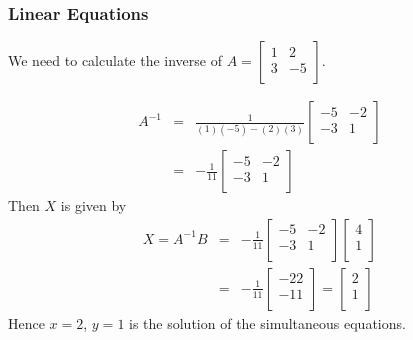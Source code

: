   \begin{frame}[fragile]\frametitle{Linear Equations}

We need to calculate the inverse of $A=\left[
\begin{array}{cc}
1 & 2 \\
3 & -5 \\
\end{array}
\right]$.

\begin{eqnarray*}
A^{-1} &=& \frac{1}{(1)(-5)-(2)(3)}\left[
\begin{array}{cc}
-5 & -2 \\
-3 & 1 \\
\end{array}
\right] \\
&=& -\frac{1}{11}\left[
\begin{array}{cc}
-5 & -2 \\
-3 & 1 \\
\end{array}
\right] 
\end{eqnarray*}
Then $X$ is given by
\begin{eqnarray*}
X = A^{-1}B &=&-\frac{1}{11}\left[
\begin{array}{cc}
-5 & -2 \\
-3 & 1 \\
\end{array}
\right]  \left[
\begin{array}{c}
4 \\
1\\
\end{array} 
\right] \\
&=& -\frac{1}{11}\left[
\begin{array}{c}
-22\\
-11\\
\end{array} 
\right]
= \left[
\begin{array}{c}
2\\
1\\
\end{array} 
\right]
\end{eqnarray*}
Hence $x=2$, $y=1$ is the solution of the simultaneous equations.

\end{frame}

